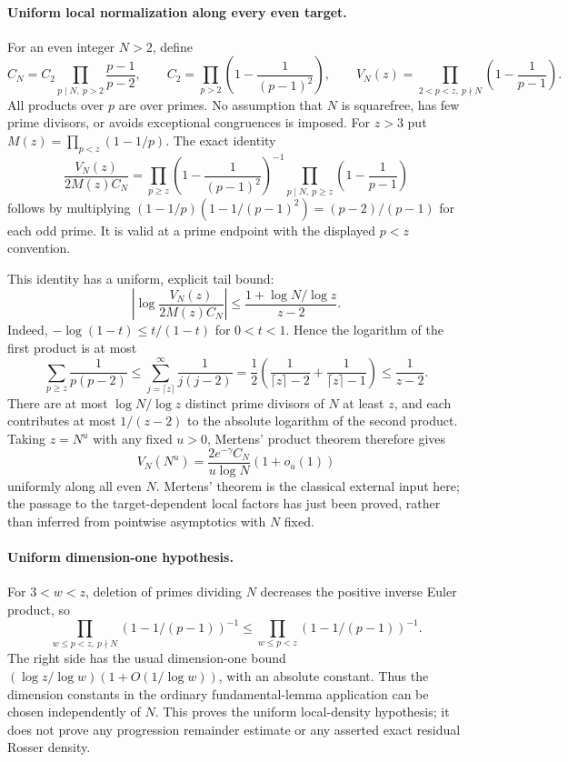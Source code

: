 \paragraph{Uniform local normalization along every even target.}
For an even integer $N>2$, define
\[
 C_N=C_2\prod_{p\mid N,\ p>2}\frac{p-1}{p-2},\qquad
 C_2=\prod_{p>2}\left(1-\frac1{(p-1)^2}\right),\qquad
 V_N(z)=\prod_{2<p<z,\ p\nmid N}\left(1-\frac1{p-1}\right).
\]
All products over $p$ are over primes.  No assumption that $N$ is
squarefree, has few prime divisors, or avoids exceptional congruences
is imposed.  For $z>3$ put $M(z)=\prod_{p<z}(1-1/p)$.  The exact identity
\[
 \frac{V_N(z)}{2M(z)C_N}
 =\prod_{p\ge z}\left(1-\frac1{(p-1)^2}\right)^{-1}
   \prod_{p\mid N,\ p\ge z}\left(1-\frac1{p-1}\right)
\]
follows by multiplying
$(1-1/p)(1-1/(p-1)^2)=(p-2)/(p-1)$ for each odd prime.
It is valid at a prime endpoint with the displayed $p<z$ convention.

This identity has a uniform, explicit tail bound:
\[
 \left|\log\frac{V_N(z)}{2M(z)C_N}\right|
 \le \frac{1+\log N/\log z}{z-2}.
\]
Indeed, $-\log(1-t)\le t/(1-t)$ for $0<t<1$.  Hence the logarithm
of the first product is at most
\[
 \sum_{p\ge z}\frac1{p(p-2)}
 \le\sum_{j=\lceil z\rceil}^{\infty}\frac1{j(j-2)}
 =\frac12\left(\frac1{\lceil z\rceil-2}
                   +\frac1{\lceil z\rceil-1}\right)
 \le\frac1{z-2}.
\]
There are at most $\log N/\log z$ distinct prime divisors of $N$
at least $z$, and each contributes at most $1/(z-2)$ to the
absolute logarithm of the second product.  Taking $z=N^u$ with
any fixed $u>0$, Mertens' product theorem therefore gives
\[
 V_N(N^u)=\frac{2e^{-\gamma}C_N}{u\log N}(1+o_u(1))
\]
uniformly along all even $N$.  Mertens' theorem is the classical
external input here; the passage to the target-dependent local factors
has just been proved, rather than inferred from pointwise asymptotics
with $N$ fixed.

\paragraph{Uniform dimension-one hypothesis.}
For $3<w<z$, deletion of primes dividing $N$ decreases the positive
inverse Euler product, so
\[
 \prod_{w\le p<z,\ p\nmid N}(1-1/(p-1))^{-1}
 \le\prod_{w\le p<z}(1-1/(p-1))^{-1}.
\]
The right side has the usual dimension-one bound
$(\log z/\log w)(1+O(1/\log w))$, with an absolute constant.
Thus the dimension constants in the ordinary fundamental-lemma
application can be chosen independently of $N$.  This proves the
uniform local-density hypothesis; it does not prove any progression
remainder estimate or any asserted exact residual Rosser density.


